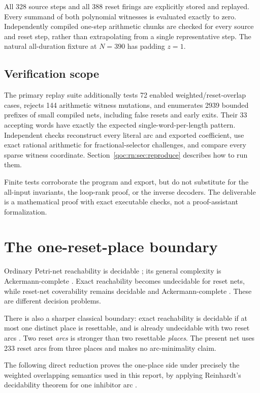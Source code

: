 \documentclass[11pt,letterpaper]{article}
\theoremstyle{definition}
\theoremstyle{remark}
\begin{document}
All 328 source steps and all 388 reset firings are explicitly stored and replayed. Every summand of both polynomial witnesses is evaluated exactly to zero. Independently compiled one-step arithmetic chunks are checked for every source and reset step, rather than extrapolating from a single representative step. The natural all-duration fixture at $N=390$ has padding $z=1$.

\subsection{Verification scope}
The primary replay suite additionally tests 72 enabled weighted/reset-overlap cases, rejects 144 arithmetic witness mutations, and enumerates 2939 bounded prefixes of small compiled nets, including false resets and early exits. Their 33 accepting words have exactly the expected single-word-per-length pattern. Independent checks reconstruct every literal arc and exported coefficient, use exact rational arithmetic for fractional-selector challenges, and compare every sparse witness coordinate. Section~\ref{qoc:rn:sec:reproduce} describes how to run them.

Finite tests corroborate the program and export, but do not substitute for the all-input invariants, the loop-rank proof, or the inverse decoders. The deliverable is a mathematical proof with exact executable checks, not a proof-assistant formalization.

\section{The one-reset-place boundary}
\label{qoc:rn:sec:boundary}
Ordinary Petri-net reachability is decidable \cite{rn:mayr}; its general complexity is Ackermann-complete \cite{rn:co}. Exact reachability becomes undecidable for reset nets, while reset-net coverability remains decidable and Ackermann-complete \cite{rn:dfs,rn:schnoebelen,rn:bfp}. These are different decision problems.

There is also a sharper classical boundary: exact reachability is decidable if at most one distinct place is resettable, and is already undecidable with two reset arcs \cite[Theorem 4.2 and Section 5.2]{rn:akshay}. Two reset \emph{arcs} is stronger than two resettable \emph{places}. The present net uses 233 reset arcs from three places and makes no arc-minimality claim.

The following direct reduction proves the one-place side under precisely the weighted overlapping semantics used in this report, by applying Reinhardt's decidability theorem for one inhibitor arc \cite{rn:reinhardt}.
\end{document}
